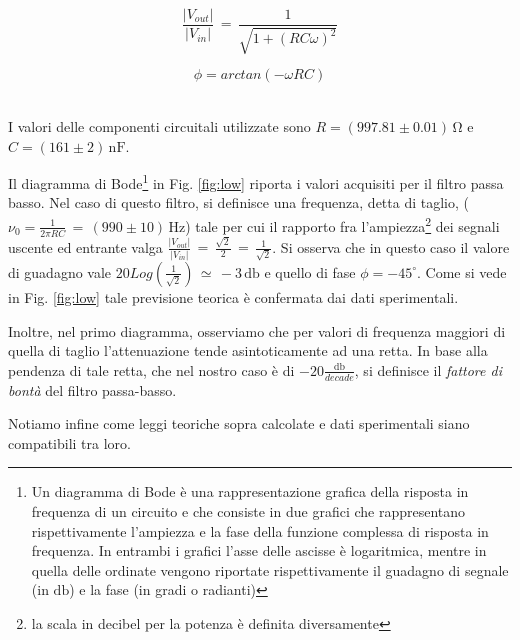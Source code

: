 \noindent
\begin{minipage}{.5\linewidth}
\begin{equation}
\frac{|V_{out}|}{|V_{in}|}\,=\,\frac{1}{\sqrt{1+(RC\omega)^2}}
\label{eq:lowGain}
\end{equation}
\end{minipage}%
\begin{minipage}{.5\linewidth}
\begin{equation}
\phi=arctan(-\omega R C)
\label{eq:lowPhi}
\end{equation}
\end{minipage}\\

\noindent I valori delle componenti circuitali utilizzate sono $R=(997.81 \pm 0.01)\,\si{\ohm}$ e $C=(161 \pm 2)\,\si{\nano\farad}$.

Il diagramma di Bode\footnote{Un diagramma di Bode è una rappresentazione grafica della risposta in frequenza di un circuito e che consiste in due grafici che rappresentano rispettivamente l'ampiezza e la fase della funzione complessa di risposta in frequenza. In entrambi i grafici l'asse delle ascisse è logaritmica, mentre in quella delle ordinate vengono riportate rispettivamente il guadagno di segnale (in $\si{\decibel}$) e la fase (in gradi o radianti)} in Fig. \ref{fig:low} riporta i valori acquisiti per il filtro passa basso. Nel caso di questo filtro, si definisce una frequenza, detta di taglio, ($\nu_0=\frac{1}{2 \pi RC}\,=\,(990\pm10)\,\si{\hertz}$) tale per cui il rapporto fra l'ampiezza\footnote{la scala in decibel per la potenza è definita diversamente} dei segnali uscente ed entrante valga $\frac{|V_{out}|}{|V_{in}|}\,=\,\frac{\sqrt{2}}{2}\,=\,\frac{1}{\sqrt{2}}$. Si osserva che in questo caso il valore di guadagno vale $20Log(\frac{1}{\sqrt{2}})\,\simeq\,-3\,\si{\decibel}$ e quello di fase $\phi=-45 ^{\circ}$. Come si vede in Fig. \ref{fig:low} tale previsione teorica è confermata dai dati sperimentali.

Inoltre, nel primo diagramma, osserviamo che per valori di frequenza maggiori di quella di taglio l'attenuazione tende asintoticamente ad una retta. In base alla pendenza di tale retta, che nel nostro caso è di $-20\frac{\si{\decibel}}{decade}$, si definisce il \emph{fattore di bontà} del filtro passa-basso.

Notiamo infine come leggi teoriche sopra calcolate e dati sperimentali siano compatibili tra loro.
%